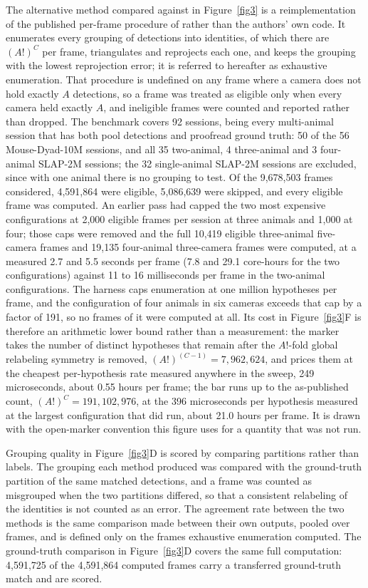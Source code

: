 \documentclass[pdflatex, sn-nature]{sn-jnl}
\theoremstyle{thmstyleone}%
\theoremstyle{thmstyletwo}%
\theoremstyle{thmstylethree}%
\begin{document}
The alternative method compared against in Figure~\ref{fig3} is a reimplementation of the published per-frame procedure of \citet{Maree2024} rather than the authors' own code. It enumerates every grouping of detections into identities, of which there are $(A!)^C$ per frame, triangulates and reprojects each one, and keeps the grouping with the lowest reprojection error; it is referred to hereafter as exhaustive enumeration. That procedure is undefined on any frame where a camera does not hold exactly $A$ detections, so a frame was treated as eligible only when every camera held exactly $A$, and ineligible frames were counted and reported rather than dropped. The benchmark covers 92 sessions, being every multi-animal session that has both pool detections and proofread ground truth: 50 of the 56 Mouse-Dyad-10M sessions, and all 35 two-animal, 4 three-animal and 3 four-animal SLAP-2M sessions; the 32 single-animal SLAP-2M sessions are excluded, since with one animal there is no grouping to test. Of the 9,678,503 frames considered, 4,591,864 were eligible, 5,086,639 were skipped, and every eligible frame was computed. An earlier pass had capped the two most expensive configurations at 2,000 eligible frames per session at three animals and 1,000 at four; those caps were removed and the full 10,419 eligible three-animal five-camera frames and 19,135 four-animal three-camera frames were computed, at a measured 2.7 and 5.5 seconds per frame (7.8 and 29.1 core-hours for the two configurations) against 11 to 16 milliseconds per frame in the two-animal configurations. The harness caps enumeration at one million hypotheses per frame, and the configuration of four animals in six cameras exceeds that cap by a factor of 191, so no frames of it were computed at all. Its cost in Figure~\ref{fig3}F is therefore an arithmetic lower bound rather than a measurement: the marker takes the number of distinct hypotheses that remain after the $A!$-fold global relabeling symmetry is removed, $(A!)^{(C-1)} = 7{,}962{,}624$, and prices them at the cheapest per-hypothesis rate measured anywhere in the sweep, 249 microseconds, about 0.55 hours per frame; the bar runs up to the as-published count, $(A!)^C = 191{,}102{,}976$, at the 396 microseconds per hypothesis measured at the largest configuration that did run, about 21.0 hours per frame. It is drawn with the open-marker convention this figure uses for a quantity that was not run.

Grouping quality in Figure~\ref{fig3}D is scored by comparing partitions rather than labels. The grouping each method produced was compared with the ground-truth partition of the same matched detections, and a frame was counted as misgrouped when the two partitions differed, so that a consistent relabeling of the identities is not counted as an error. The agreement rate between the two methods is the same comparison made between their own outputs, pooled over frames, and is defined only on the frames exhaustive enumeration computed. The ground-truth comparison in Figure~\ref{fig3}D covers the same full computation: 4,591,725 of the 4,591,864 computed frames carry a transferred ground-truth match and are scored.
\end{document}
